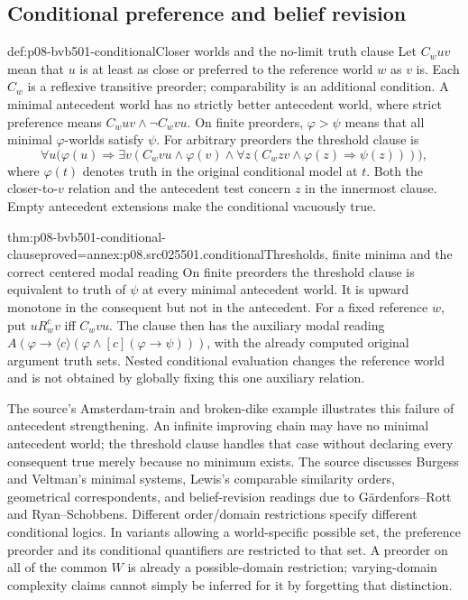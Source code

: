 \subsection{Conditional preference and belief revision}
\label{sec:p08-bvb501-conditional}

\begin{hbdefinition}{def:p08-bvb501-conditional}{Closer worlds and the no-limit truth clause}
Let \(C_wuv\) mean that \(u\) is at least as close or preferred
to the reference world \(w\) as \(v\) is. Each \(C_w\)
is a reflexive transitive preorder; comparability is an additional
condition. A minimal antecedent world has no strictly better antecedent
world, where strict preference means \(C_wuv\land\neg C_wvu\).
On finite preorders, \(\varphi>\psi\) means that all minimal
\(\varphi\)-worlds satisfy \(\psi\). For arbitrary preorders
the threshold clause is
\[
 \forall u\bigl(\varphi(u)\Rightarrow
   \exists v(C_wvu\land\varphi(v)\land
     \forall z(C_wzv\land\varphi(z)\Rightarrow\psi(z)))\bigr),
\]
where \(\varphi(t)\) denotes truth in the original conditional
model at \(t\). Both the closer-to-\(v\) relation and the
antecedent test concern \(z\) in the innermost clause. Empty
antecedent extensions make the conditional vacuously true.
\end{hbdefinition}

\begin{hbtheorem}{thm:p08-bvb501-conditional-clause}{proved=annex:p08.src025501.conditional}{Thresholds, finite minima and the correct centered modal reading}
On finite preorders the threshold clause is equivalent to truth of
\(\psi\) at every minimal antecedent world. It is upward monotone
in the consequent but not in the antecedent. For a fixed reference
\(w\), put \(uR_w^cv\) iff \(C_wvu\). The clause then
has the auxiliary modal reading
\(A(\varphi\to\langle c\rangle(\varphi\land[c](\varphi\to\psi)))\),
with the already computed original argument truth sets. Nested conditional
evaluation changes the reference world and is not obtained by globally
fixing this one auxiliary relation.
\end{hbtheorem}

The source's Amsterdam-train and broken-dike example illustrates this
failure of antecedent strengthening. An infinite improving chain may
have no minimal antecedent world; the threshold clause handles that
case without declaring every consequent true merely because no minimum
exists. The source discusses Burgess and Veltman's minimal systems,
Lewis's comparable similarity orders, geometrical correspondents, and
belief-revision readings due to G\"ardenfors--Rott and Ryan--Schobbens.
Different order/domain restrictions specify different conditional logics.
In variants allowing a world-specific possible set, the preference
preorder and its conditional quantifiers are restricted to that set.
A preorder on all of the common \(W\) is already a possible-domain
restriction; varying-domain complexity claims cannot simply be inferred
for it by forgetting that distinction.

